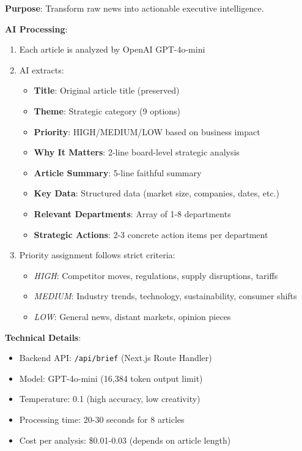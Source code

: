 \documentclass[11pt,a4paper]{article}
\begin{document}
\textbf{Purpose}: Transform raw news into actionable executive intelligence.

\textbf{AI Processing}:
\begin{enumerate}[leftmargin=*]
    \item Each article is analyzed by OpenAI GPT-4o-mini
    \item AI extracts:
    \begin{itemize}
        \item \textbf{Title}: Original article title (preserved)
        \item \textbf{Theme}: Strategic category (9 options)
        \item \textbf{Priority}: HIGH/MEDIUM/LOW based on business impact
        \item \textbf{Why It Matters}: 2-line board-level strategic analysis
        \item \textbf{Article Summary}: 5-line faithful summary
        \item \textbf{Key Data}: Structured data (market size, companies, dates, etc.)
        \item \textbf{Relevant Departments}: Array of 1-8 departments
        \item \textbf{Strategic Actions}: 2-3 concrete action items per department
    \end{itemize}
    
    \item Priority assignment follows strict criteria:
    \begin{itemize}
        \item \textit{HIGH}: Competitor moves, regulations, supply disruptions, tariffs
        \item \textit{MEDIUM}: Industry trends, technology, sustainability, consumer shifts
        \item \textit{LOW}: General news, distant markets, opinion pieces
    \end{itemize}
\end{enumerate}

\textbf{Technical Details}:
\begin{itemize}[leftmargin=*]
    \item Backend API: \texttt{/api/brief} (Next.js Route Handler)
    \item Model: GPT-4o-mini (16,384 token output limit)
    \item Temperature: 0.1 (high accuracy, low creativity)
    \item Processing time: 20-30 seconds for 8 articles
    \item Cost per analysis: \$0.01-0.03 (depends on article length)
\end{itemize}
\end{document}
